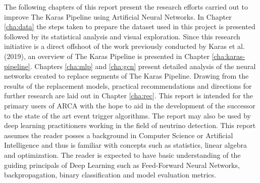 The following chapters of this report present the research efforts
carried out to improve The Karas Pipeline using Artificial Neural
Networks. In Chapter \ref{cha:data} the steps taken to prepare the
dataset used in this project is presented followed by its statistical
analysis and visual exploration. Since this research initiative is a
direct offshoot of the work previously conducted by Karas et al.
(2019), an overview of The Karas Pipeline is presented in Chapter
\ref{cha:karas-pipeline}. Chapters \ref{cha:mlp} and \ref{cha:gcn}
present detailed analysis of the neural networks created to replace
segments of The Karas Pipeline. Drawing from the results of the
replacement models, practical recommendations and directions for
further research are laid out in Chapter \ref{cha:rec}. This report is
intended for the primary users of ARCA with the hope to aid in the
development of the successor to the state of the art event trigger
algorithms. The report may also be used by deep learning practitioners
working in the field of neutrino detection. This report assumes the
reader posses a background in Computer Science or Artificial
Intelligence and thus is familiar with concepts such as statistics,
linear algebra and optimization. The reader is expected to have basic
understanding of the guiding principals of Deep Learning such as
Feed-Forward Neural Networks, backpropagation, binary classification
and model evaluation metrics.
